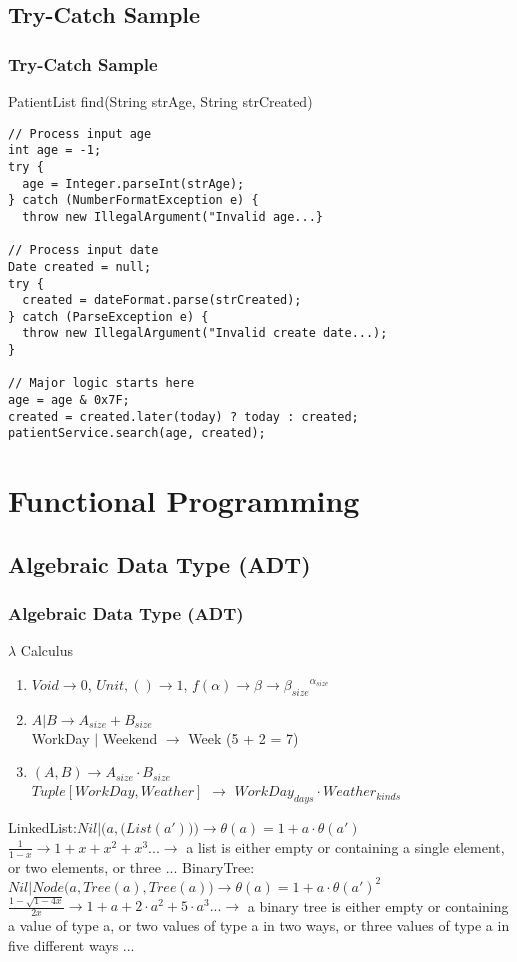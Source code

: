 \documentclass{beamer}
\begin{document}
\subsection{Try-Catch Sample}
\begin{frame}[fragile]
  \frametitle{Try-Catch Sample}
PatientList find(String strAge, String strCreated)
\scriptsize{
\begin{verbatim}
// Process input age
int age = -1;
try {
  age = Integer.parseInt(strAge);
} catch (NumberFormatException e) {
  throw new IllegalArgument("Invalid age...}

// Process input date
Date created = null;
try {
  created = dateFormat.parse(strCreated);
} catch (ParseException e) {
  throw new IllegalArgument("Invalid create date...);
}

// Major logic starts here
age = age & 0x7F;
created = created.later(today) ? today : created;
patientService.search(age, created);
\end{verbatim}
} 
\end{frame}

\section{Functional Programming}
\subsection{Algebraic Data Type (ADT)}
\begin{frame}
  \frametitle{Algebraic Data Type (ADT)}
  \begin{block}{$\lambda$ Calculus} %
    \begin{enumerate}
    \item $Void \rightarrow 0$, $Unit, () \rightarrow 1$, $f(\alpha) \rightarrow \beta \rightarrow {\beta_{size}}^{\alpha_{size}}$
    \item $A | B \rightarrow A_{size} + B_{size}$
    \\ WorkDay $|$ Weekend $\rightarrow$ Week (5 + 2 = 7)
    \item $(A, B) \rightarrow A_{size} \cdot B_{size}$
    \\ $Tuple\left [WorkDay, Weather\right]$ $\rightarrow$ $WorkDay_{days} \cdot Weather_{kinds}$
    \end{enumerate}
  \end{block}
  \begin{example} %
  \alert{LinkedList:}$Nil | \Big(a, \big(List({a}')\big)\Big) \rightarrow \theta(a) = 1 + a \cdot \theta({a}')$ 
  $\frac{1}{1-x} \rightarrow 1+x+x^2+x^3... \rightarrow$ a list is either empty or containing a single element, or two elements, or three ...
  \alert{BinaryTree:}$Nil | Node\big(a, Tree(a), Tree(a)\big) \rightarrow \theta(a) = 1 + a \cdot \theta({a}')^2$ 
  $\frac{1-\sqrt{1-4x}}{2x} \rightarrow 1+a+2\cdot a^2 + 5 \cdot a^3 ... \rightarrow$ a binary tree is either empty or containing a value of type a, or two values of type a in two ways, or three values of type a in five different ways ...
  \end{example} 
\end{frame}
\end{document}
